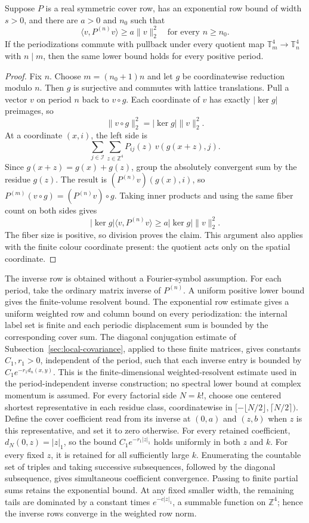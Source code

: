 \begin{lemma}
\label{lem:ex-reader-folding}
Suppose $P$ is a real symmetric cover row, has an exponential row bound
of width $s>0$, and there are $a>0$ and $n_0$ such that
\[
 \langle v,P^{(n)}v\rangle\ge a\|v\|_2^2
 \quad\text{for every }n\ge n_0.
\]
If the periodizations commute with pullback under every quotient map
$\mathbb T_m^4\to\mathbb T_n^4$ with $n\mid m$, then the same lower bound
holds for every positive period.
\end{lemma}
\begin{proof}
Fix $n$. Choose $m=(n_0+1)n$ and let $g$ be coordinatewise reduction
modulo $n$. Then $g$ is surjective and commutes with lattice translations.
Pull a vector $v$ on period $n$ back to $v\circ g$. Each coordinate of
$v$ has exactly $|\ker g|$ preimages, so
\[
 \|v\circ g\|_2^2=|\ker g|\|v\|_2^2.
\]
At a coordinate $(x,i)$, the left side is
\[
 \sum_{j\in\mathcal I}\sum_{z\in\mathbb Z^4}
       P_{ij}(z)\,v(g(x+z),j).
\]
Since $g(x+z)=g(x)+g(z)$, group the absolutely convergent sum by the
residue $g(z)$. The result is $(P^{(n)}v)(g(x),i)$, so
$P^{(m)}(v\circ g)=(P^{(n)}v)\circ g$. Taking inner products and
using the same fiber count on both sides gives
\[
 |\ker g|\langle v,P^{(n)}v\rangle
 \ge a|\ker g|\|v\|_2^2.
\]
The fiber size is positive, so division proves the claim. This argument
also applies with the finite colour coordinate present: the quotient acts
only on the spatial coordinate.
\end{proof}

The inverse row is obtained without a Fourier-symbol assumption. For each
period, take the ordinary matrix inverse of $P^{(n)}$. A uniform positive
lower bound gives the finite-volume resolvent bound. The exponential row
estimate gives a uniform weighted row and column bound on every
periodization: the internal label set is finite and each periodic
 displacement sum is bounded by the corresponding cover sum. The diagonal
conjugation estimate of Subsection~\ref{sec:local-covariance}, applied to
these finite matrices, gives constants $C_1,r_1>0$, independent of the
period, such that each inverse entry is bounded by
$C_1e^{-r_1d_n(x,y)}$. This is the finite-dimensional weighted-resolvent
estimate used in the period-independent inverse construction; no spectral
lower bound at complex momentum is assumed.
For every factorial side $N=k!$, choose one centered shortest
representative in each residue class, coordinatewise in
$[-\lfloor N/2\rfloor,\lceil N/2\rceil)$. Define the cover coefficient
read from its inverse at $(0,a)$ and $(z,b)$ when $z$ is this representative,
and set it to zero otherwise. For every retained coefficient,
$d_N(0,z)=|z|_1$, so the bound $C_1e^{-r_1|z|_1}$ holds uniformly in both
$z$ and $k$. For every fixed $z$, it is retained for all sufficiently large
$k$. Enumerating the countable set of triples and taking successive
subsequences, followed by the diagonal subsequence, gives simultaneous
coefficient convergence. Passing to finite
partial sums retains the exponential bound. At any fixed smaller width,
the remaining tails are dominated by a constant times
$e^{-c|z|_1}$, a summable function on $\mathbb Z^4$; hence the inverse rows
converge in the weighted row norm.

